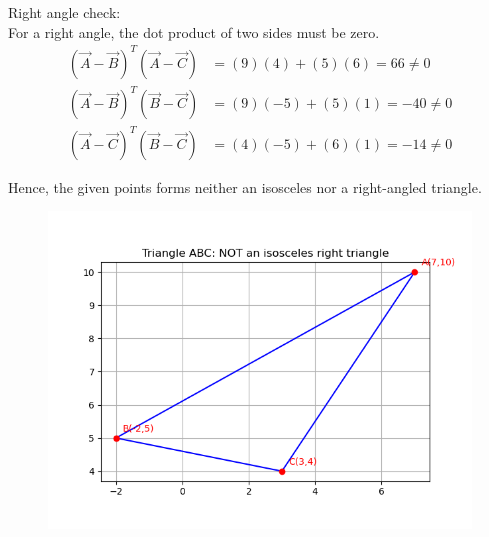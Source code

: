 \documentclass[journal]{article}
\begin{document}
Right angle check:\\

For a right angle, the dot product of two sides must be zero.
\begin{align}
(\vec{A}-\vec{B})^T(\vec{A}-\vec{C}) &= (9)(4) + (5)(6) = 66 \neq 0 \\
(\vec{A}-\vec{B})^T(\vec{B}-\vec{C}) &= (9)(-5) + (5)(1) = -40 \neq 0 \\
(\vec{A}-\vec{C})^T(\vec{B}-\vec{C}) &= (4)(-5) + (6)(1) = -14 \neq 0
\end{align}

Hence, the given points forms neither an isosceles nor a right-angled triangle.
\newpage
\begin{figure}
    \centering
    \includegraphics[width=1.0\linewidth]{fig1.png}
    \caption{}
    \label{fig:placeholder}
\end{figure}
\end{document}
